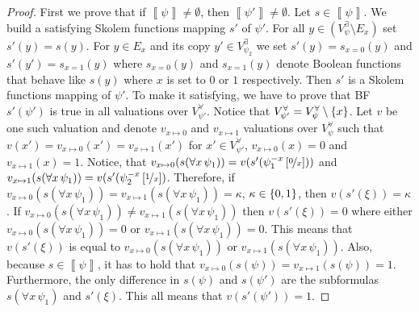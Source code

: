 \documentclass[
  digital, %
  color,
  twoside, %
  table,   %
  nolof,     %
  nolot,     %
]{fithesis3}
\let\setbuilder\set
\newcommand{\simpleset}[1]{\{{#1}\}}
\renewcommand{\set}[1]{\normalexpandarg\IfSubStr{#1}{|}{\setbuilder{#1}}{\simpleset{#1}}}
\theoremstyle{definition}
\theoremstyle{remark}
\newcommand{\seman}[1]{\left\llbracket {#1} \right\rrbracket}
\newcommand{\substitute}[2]{\left[ \nicefrac{#2}{#1} \right]}
\newcommand{\evars}[1]{V_{#1}^{\exists}}
\newcommand{\uvars}[1]{V_{#1}^{\forall}}
\newcommand{\itholds}{\,}
\begin{document}
\begin{proof}
  First we prove that if $\seman{\psi} \not= \emptyset$, then $\seman{\psi'} \not= \emptyset$. Let $s \in \seman{\psi}$. We build a satisfying Skolem functions mapping $s'$ of $\psi'$. For all $y \in (\evars{\psi} \setminus E_x)$ set $s'(y) = s(y)$. For $y \in E_x$ and its copy $y' \in \evars{\psi_2}$ we set $s'(y) = s_{x=0}(y)$ and $s'(y') = s_{x=1}(y)$ where $s_{x=0}(y)$ and $s_{x=1}(y)$ denote Boolean functions that behave like $s(y)$ where $x$ is set to $0$ or $1$ respectively. Then $s'$ is a Skolem functions mapping of $\psi'$. To make it satisfying, we have to prove that BF $s'(\psi')$ is true in all valuations over $\uvars{\psi'}$. Notice that $\uvars{\psi'} = \uvars{\psi} \setminus \set{x}$. Let $v$ be one such valuation and denote $v_{x\mapsto0}$ and $v_{x\mapsto1}$ valuations over $\uvars{\psi}$ such that $v(x') = v_{x\mapsto0}(x') = v_{x\mapsto1}(x')$ for $x' \in \uvars{\psi'}$, $v_{x\mapsto0}(x) = 0$ and $v_{x\mapsto1}(x) = 1$. Notice, that $v_{x\mapsto0}(s(\forall x\itholds\psi_1)) = v(s'(\psi_1^{-x}\substitute{x}{0}))$ and $v_{x\mapsto1}(s(\forall x\itholds\psi_1)) = v(s'(\psi_2^{-x}\substitute{x}{1})$. Therefore, if $v_{x\mapsto0}(s(\forall x\itholds\psi_1)) = v_{x\mapsto1}(s(\forall x\itholds\psi_1)) = \kappa$, $\kappa \in \set{0,1}$, then $v(s'(\xi)) = \kappa$. If $v_{x\mapsto0}(s(\forall x\itholds\psi_1)) \not= v_{x\mapsto1}(s(\forall x\itholds\psi_1))$ then $v(s'(\xi)) = 0$ where either $v_{x\mapsto0}(s(\forall x\itholds\psi_1)) = 0$ or $v_{x\mapsto1}(s(\forall x\itholds\psi_1)) = 0$. This means that $v(s'(\xi))$ is equal to $v_{x\mapsto0}(s(\forall x\itholds\psi_1))$ or $v_{x\mapsto1}(s(\forall x\itholds\psi_1))$. Also, because $s \in \seman{\psi}$, it has to hold that $v_{x\mapsto0}(s(\psi)) = v_{x\mapsto1}(s(\psi)) = 1$. Furthermore, the only difference in $s(\psi)$ and $s(\psi')$ are the subformulas $s(\forall x\itholds\psi_1)$ and $s'(\xi)$. This all means that $v(s'(\psi')) = 1$.


\end{proof}
\end{document}
